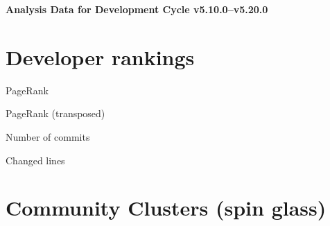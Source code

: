 \documentclass{article}
\begin{document}
\setlength{\parindent}{0pt}
\begin{center}
\begin{Large}
\textbf{Analysis Data for Development Cycle v5.10.0--v5.20.0}
\end{Large}
\end{center}
\section{Developer rankings}
\begin{small}\renewcommand{\tabcolsep}{1pt}
\begin{minipage}{0.5\linewidth}
PageRank\\

\end{minipage}%
\begin{minipage}{0.5\linewidth}
PageRank (transposed)\\

\end{minipage}

\renewcommand{\tabcolsep}{5pt}
\begin{minipage}{0.5\linewidth}
Number of commits\\

\end{minipage}%
\begin{minipage}{0.5\linewidth}
Changed lines\\

\end{minipage}
\end{small}
\newpage\section{Community Clusters (spin glass)}
\end{document}
